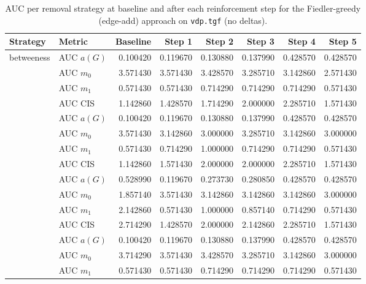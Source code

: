 
\begin{table}[htbp]
  \centering
  \caption{AUC per removal strategy at baseline and after each reinforcement step for the Fiedler-greedy (edge-add) approach on \texttt{vdp.tgf} (no deltas).}
  \label{tab:vdp-fiedler_greedy-auc}
  \begin{tabular}{llrrrrrr}
    \toprule
    \textbf{Strategy} & \textbf{Metric} & \textbf{Baseline} & \textbf{Step 1} & \textbf{Step 2} & \textbf{Step 3} & \textbf{Step 4} & \textbf{Step 5} \\
    \midrule
    \multirow{4}{*}{betweeness} & AUC $a(G)$ & 0.100420 & 0.119670 & 0.130880 & 0.137990 & 0.428570 & 0.428570 \\
    & AUC $m_0$ & 3.571430 & 3.571430 & 3.428570 & 3.285710 & 3.142860 & 2.571430 \\
    & AUC $m_1$ & 0.571430 & 0.571430 & 0.714290 & 0.714290 & 0.714290 & 0.571430 \\
    & AUC CIS & 1.142860 & 1.428570 & 1.714290 & 2.000000 & 2.285710 & 1.571430 \\
    \addlinespace
    \multirow{4}{*}{closeness} & AUC $a(G)$ & 0.100420 & 0.119670 & 0.130880 & 0.137990 & 0.428570 & 0.428570 \\
    & AUC $m_0$ & 3.571430 & 3.142860 & 3.000000 & 3.285710 & 3.142860 & 3.000000 \\
    & AUC $m_1$ & 0.571430 & 0.714290 & 1.000000 & 0.714290 & 0.714290 & 0.571430 \\
    & AUC CIS & 1.142860 & 1.571430 & 2.000000 & 2.000000 & 2.285710 & 1.571430 \\
    \addlinespace
    \multirow{4}{*}{core influence} & AUC $a(G)$ & 0.528990 & 0.119670 & 0.273730 & 0.280850 & 0.428570 & 0.428570 \\
    & AUC $m_0$ & 1.857140 & 3.571430 & 3.142860 & 3.142860 & 3.142860 & 3.000000 \\
    & AUC $m_1$ & 2.142860 & 0.571430 & 1.000000 & 0.857140 & 0.714290 & 0.571430 \\
    & AUC CIS & 2.714290 & 1.428570 & 2.000000 & 2.142860 & 2.285710 & 1.571430 \\
    \addlinespace
    \multirow{4}{*}{degree} & AUC $a(G)$ & 0.100420 & 0.119670 & 0.130880 & 0.137990 & 0.428570 & 0.428570 \\
    & AUC $m_0$ & 3.714290 & 3.571430 & 3.428570 & 3.285710 & 3.142860 & 3.000000 \\
    & AUC $m_1$ & 0.571430 & 0.571430 & 0.714290 & 0.714290 & 0.714290 & 0.571430 \\

\end{tabular}
\end{table}
